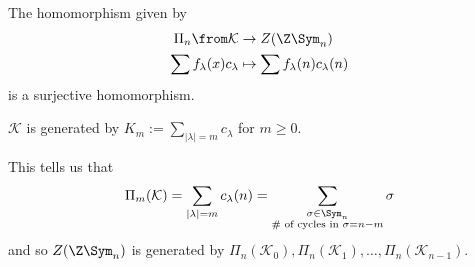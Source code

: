 \documentclass[11pt,leqno,oneside]{amsbook}
\newcommand{\K}{\mathcal{K}} %
\numberwithin{thm}{section}
\begin{document}
\begin{thm}
  The homomorphism given by
  \begin{align*}
    \Pi_n \from \K & \to Z(\Z\Sym_n)\\
    \sum f_\lambda(x)c_\lambda & \mapsto \sum f_\lambda(n) c_\lambda(n)
  \end{align*}
  is a surjective homomorphism.
\end{thm}
\begin{prop}
  \(\K\) is generated by \(K_m := \sum_{|\lambda|=m} c_\lambda\) for
  \(m \geq 0\).
\end{prop}
This tells us that \[
  \Pi_m(\K) = \sum_{|\lambda|=m} c_\lambda(n) = \sum_{\substack{\sigma
      \in \Sym_n \\ \# \text{ of cycles in } \sigma = n-m}} \sigma
\]
and so \(Z(\Z\Sym_n)\) is generated by \(\Pi_n(\K_0), \Pi_n(\K_1),
\ldots, \Pi_n(\K_{n-1})\). 
\end{document}
